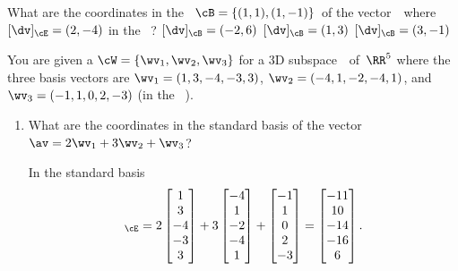\begin{activity}
What are the coordinates in the ~\(\cB=\{(1,1),(1,-1)\}\)\ of the vector~\dv\ where \([\dv]_\cE=(2,-4)\) in the ~\cE?
{\([\dv]_\cB=(-2,6)\)}
{\([\dv]_\cB=(1,3)\)}
{\([\dv]_\cB=(3,-1)\)}
\end{activity}





\begin{example} 
You are given a  \(\cW=\{\wv_1,\wv_2,\wv_3\}\) for a 3D subspace~\WW\ of~\(\RR^5\) where the three basis vectors are
\(\wv_1=(1,3,-4,-3,3)\),
\(\wv_2=(-4,1,-2,-4,1)\), and
\(\wv_3=(-1,1,0,2,-3)\) (in the ~\cE).
\begin{enumerate}
\item What are the coordinates in the standard basis of the vector \(\av=2\wv_1+3\wv_2+\wv_3\)?
\begin{solution} 
In the standard basis
\begin{equation*}
[\av]_\cE=2\begin{bmatrix} 1\\3\\-4\\-3\\3 \end{bmatrix}
+3\begin{bmatrix} -4\\1\\-2\\-4\\1 \end{bmatrix}
+\begin{bmatrix} -1\\1\\0\\2\\-3 \end{bmatrix}
=\begin{bmatrix} -11\\ 10\\-14\\-16\\  6 \end{bmatrix}.
\end{equation*}
\end{solution}


\end{enumerate}
\end{example}
